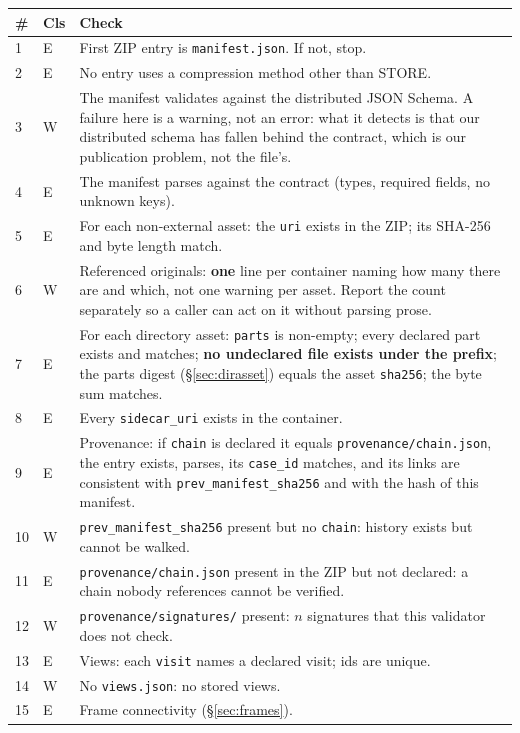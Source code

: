 \documentclass[11pt,a4paper]{article}
\newcommand{\code}[1]{\texttt{\small #1}}
\begin{document}
\begin{longtable}{C{0.8cm} C{0.9cm} L{13.4cm}}
\toprule
\textbf{\#} & \textbf{Cls} & \textbf{Check}\\
\midrule
{} & E & First ZIP entry is \code{manifest.json}. If not, stop.\\
2 & E & No entry uses a compression method other than STORE.\\
3 & W & The manifest validates against the distributed JSON Schema. A failure here is
a warning, not an error: what it detects is that our distributed schema has fallen behind the
contract, which is our publication problem, not the file's.\\
4 & E & The manifest parses against the contract (types, required fields, no unknown
keys).\\
5 & E & For each non-external asset: the \code{uri} exists in the ZIP; its SHA-256 and byte
length match.\\
6 & W & Referenced originals: \textbf{one} line per container naming how many there are
and which, not one warning per asset. Report the count separately so a caller can act on it
without parsing prose.\\
7 & E & For each directory asset: \code{parts} is non-empty; every declared part exists and
matches; \textbf{no undeclared file exists under the prefix}; the parts digest
(\S\ref{sec:dirasset}) equals the asset \code{sha256}; the byte sum matches.\\
8 & E & Every \code{sidecar\_uri} exists in the container.\\
9 & E & Provenance: if \code{chain} is declared it equals \code{provenance/chain.json}, the
entry exists, parses, its \code{case\_id} matches, and its links are consistent with
\code{prev\_manifest\_sha256} and with the hash of this manifest.\\
10 & W & \code{prev\_manifest\_sha256} present but no \code{chain}: history exists but
cannot be walked.\\
11 & E & \code{provenance/chain.json} present in the ZIP but not declared: a chain nobody
references cannot be verified.\\
12 & W & \code{provenance/signatures/} present: $n$ signatures that this validator does not
check.\\
13 & E & Views: each \code{visit} names a declared visit; ids are unique.\\
14 & W & No \code{views.json}: no stored views.\\
15 & E & Frame connectivity (\S\ref{sec:frames}).\\

\end{longtable}
\end{document}
